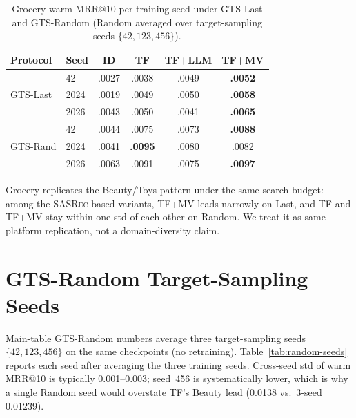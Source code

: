 \documentclass[sigconf,natbib=true,anonymous]{acmart}
\newcommand{\tfmv}{\textsc{TF+MV}\xspace}
\newcommand{\base}{\textsc{SASRec}\xspace}
\begin{document}
\begin{table}[h]
\centering
\caption{Grocery warm MRR@10 per training seed under GTS-Last and GTS-Random (Random averaged over target-sampling seeds $\{42,123,456\}$).}
\label{tab:grocery-perseed}
\small
\setlength{\tabcolsep}{3pt}
\begin{tabular}{@{}llcccc@{}}
\toprule
Protocol & Seed & ID & TF & TF+LLM & TF+MV \\
\midrule
\multirow{3}{*}{GTS-Last}
 & 42    & .0027 & .0038 & .0049 & \textbf{.0052} \\
 & 2024  & .0019 & .0049 & .0050 & \textbf{.0058} \\
 & 2026  & .0043 & .0050 & .0041 & \textbf{.0065} \\
\midrule
\multirow{3}{*}{GTS-Rand}
 & 42    & .0044 & .0075 & .0073 & \textbf{.0088} \\
 & 2024  & .0041 & \textbf{.0095} & .0080 & .0082 \\
 & 2026  & .0063 & .0091 & .0075 & \textbf{.0097} \\
\bottomrule
\end{tabular}
\end{table}

Grocery replicates the Beauty/Toys pattern under the same search budget: among the \base-based variants, \tfmv leads narrowly on Last, and TF and \tfmv stay within one std of each other on Random.
We treat it as same-platform replication, not a domain-diversity claim.

\section{GTS-Random Target-Sampling Seeds}
\label{app:random-seeds}

Main-table GTS-Random numbers average three target-sampling seeds $\{42,123,456\}$ on the same checkpoints (no retraining).
Table~\ref{tab:random-seeds} reports each seed after averaging the three training seeds.
Cross-seed std of warm MRR@10 is typically 0.001--0.003; seed~456 is systematically lower, which is why a single Random seed would overstate TF's Beauty lead (0.0138 vs.\ 3-seed 0.01239).
\end{document}
